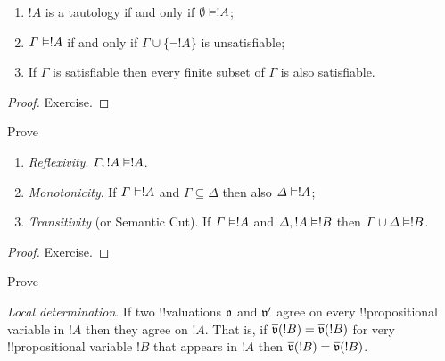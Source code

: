 \documentclass[../../../include/open-logic-section]{subfiles}
\begin{document}


\begin{prop}
\begin{enumerate} 
  \item $!A$ is a tautology if and only if $\emptyset \Entails !A$; 
  \item $\Gamma \Entails !A$ if and only if $\Gamma \cup \{\lnot !A\}$ is unsatisfiable; 
  \item If $\Gamma$ is satisfiable then every finite subset of $\Gamma$
  is also satisfiable.
\end{enumerate}
\end{prop}

\begin{proof}
Exercise.
\end{proof}

\begin{prob}
Prove 
\end{prob}

\begin{prop}
\begin{enumerate}
  \item {} \emph{Reflexivity}. $\Gamma, !A \Entails !A$. 
  \item {} \emph{Monotonicity}. If $\Gamma \Entails !A$ and $\Gamma \subseteq \Delta$ then also $\Delta \Entails !A$;
  \item {} \emph{Transitivity} (or Semantic Cut). If $\Gamma \Entails !A$ and $\Delta, !A \Entails !B$ then $\Gamma \cup \Delta \Entails !B$.
\end{enumerate}
\end{prop}

\begin{proof}
Exercise.
\end{proof}

\begin{prob}
Prove 
\end{prob}

\begin{prop}
\emph{Local determination}. If two !!{valuation}s $\pAssign{v}$ and $\pAssign{v'}$ agree on every !!{propositional variable} in $!A$ then they agree on $!A$. That is, if $\pValue{v}(!B)=\pValue{v}(!B)$ for very !!{propositional variable} $!B$ that appears in $!A$ then $\pValue{v}(!B)=\pValue{v}(!B)$.
\end{prop}
\end{document}
